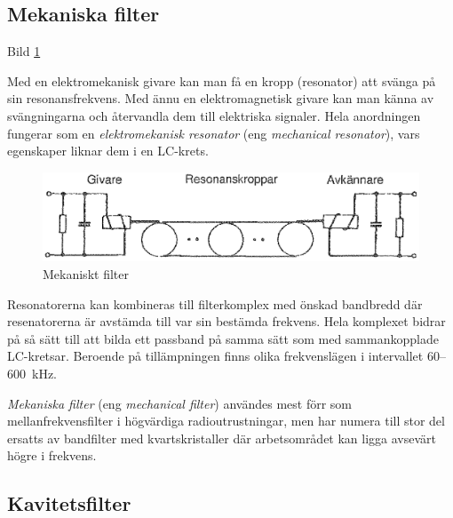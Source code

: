 \subsection{Mekaniska filter}

Bild \ref{fig:BildII3-30}

Med en elektromekanisk givare kan man få en kropp (resonator) att svänga på sin
resonansfrekvens. Med ännu en elektromagnetisk givare kan man känna av
svängningarna och återvandla dem till elektriska signaler. Hela anordningen
fungerar som en \emph{elektromekanisk resonator} (eng
\emph{mechanical resonator}), vars egenskaper liknar dem i en LC-krets.

\begin{figure}
\includegraphics[width=\textwidth]{images/bild_2_3-30.png}
\caption{Mekaniskt filter}
\label{fig:BildII3-30}
\end{figure}

Resonatorerna kan kombineras till filterkomplex med önskad bandbredd där
resenatorerna är avstämda till var sin bestämda frekvens. Hela komplexet bidrar
på så sätt till att bilda ett passband på samma sätt som med sammankopplade
LC-kretsar. Beroende på tillämpningen finns olika frekvenslägen i intervallet
60--600~kHz.

\emph{Mekaniska filter} (eng \emph{mechanical filter}) användes mest förr som
mellanfrekvensfilter i högvärdiga radioutrustningar, men har numera till stor
del ersatts av bandfilter med kvartskristaller där arbetsområdet kan ligga
avsevärt högre i frekvens.

\subsection{Kavitetsfilter}

